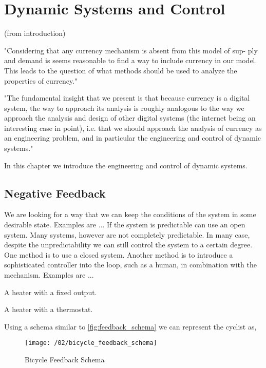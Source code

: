 \chapter{Dynamic Systems and Control}

% 

(from introduction)

"Considering that any currency mechanism is absent from this model of sup-
ply and demand is seems reasonable to find a way to include currency in our
model. This leads to the question of what methods should be used to analyze
the properties of currency."

"The fundamental insight that we present is that because currency is a digital
system, the way to approach its analysis is roughly analogous to the way we
approach the analysis and design of other digital systems (the internet being an
interesting case in point), i.e. that we should approach the analysis of currency
as an engineering problem, and in particular the engineering and control of
dynamic systems."

In this chapter we introduce the engineering and control of dynamic systems.

\section{Negative Feedback}

We are looking for a way that we can keep the conditions of the system in some desirable state.
Examples are ... If the system is predictable can use an open system. Many systems, however are not
completely predictable. In many case, despite the unpredictability we can still control the system
to a certain degree. One method is to use a closed system. Another method is to introduce a
sophisticated controller into the loop, such as a human, in combination with the mechanism. Examples
are ...

A heater with a fixed output.

A heater with a thermostat.

Using a schema similar to \ref{fig:feedback_schema} we can represent the cyclist as,

\begin{figure}
\texttt{[image: /02/bicycle\_feedback\_schema]}
\caption{Bicycle Feedback Schema}
\label{fig:bicycle_feedback_schema}
\end{figure}

